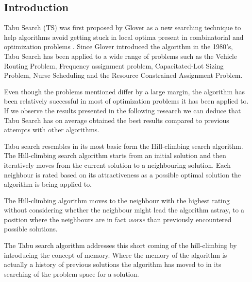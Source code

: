 \subsection{Introduction}
\label{sec:TSIntroduction}
Tabu Search (TS) was first proposed by Glover as a new searching technique to help algorithms avoid getting  stuck in local optima present in combinatorial and optimization problems \cite{TabuRCAProblem}. Since Glover introduced the algorithm in the 1980's, Tabu Search has been applied to a wide range of problems such as the Vehicle Routing Problem\cite{TabuVechicleRoutingWithTimeWindows}, Frequency assignment problem\cite{TabuMontemanniSmith}, Capacitated-Lot Sizing Problem\cite{TabuCarryOver}, Nurse Scheduling\cite{TabuNurse} and the Resource Constrained Assignment Problem\cite{TabuRCAProblem}. 

Even though the problems mentioned differ by a large margin, the algorithm has been relatively successful in most of optimization problems it has been applied to. If we observe the results presented in the following research \cite{TabuCarryOver,TabuSingleMachineScheduling,TabuVechicleRoutingWithTimeWindows,TabuBiddingStrats,TabuCrewSchedulingProblem,ReactiveTabuVHR,TabuRCAProblem,TabuCSP,TabuMontemanniSmith,tabuglobalplanning3g} we can deduce that Tabu Search has on average obtained the best results compared to previous attempts with other algorithms. 

Tabu search resembles in its most basic form the Hill-climbing search algorithm\cite{TabuBiddingStrats}. The Hill-climbing search algorithm starts from an initial solution and then iteratively moves from the current solution to a neighbouring solution\cite{AIModernApproach}. Each neighbour is rated based on its attractiveness as a possible optimal solution the algorithm is being applied to\cite{AIModernApproach}. 

The Hill-climbing algorithm moves to the neighbour with the highest rating without considering whether the neighbour might lead the algorithm astray, to a position where the neighbours are in fact \emph{worse} than previously encountered possible solutions\cite{AIModernApproach}. 

The Tabu search algorithm addresses this short coming of the hill-climbing by introducing the concept of memory\cite{TabuBiddingStrats}. Where the memory of the algorithm is actually a history of previous solutions the algorithm has moved to in its searching of the problem space for a solution\cite{TabuBiddingStrats}. 


